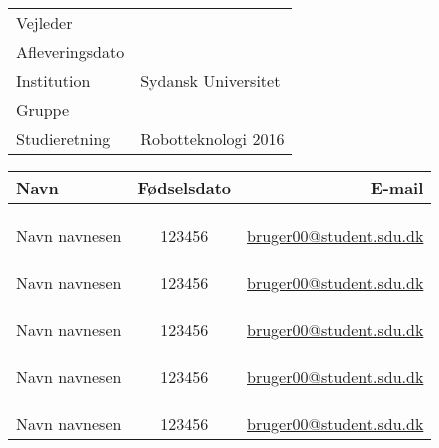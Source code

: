 \documentclass[../main.tex]{subfiles}
\begin{document}
\phantom{g}
\vspace{0.5cm}
\noindent
\begin{center}
\begin{Huge}
\textbf{\titel}
\end{Huge}
\\
\begin{huge}
\subtitel
\end{huge}
\\
\vspace{1cm}



\vspace{1.5cm}

\begin{tabular}{@{} l l @{}}
\hline
Vejleder         		&	\vejleder          	\\
Afleveringsdato 			& 	\dato				\\
Institution             	&   Sydansk Universitet	\\
Gruppe                  	&	\gruppe				\\
Studieretning           	& 	Robotteknologi 2016	\\
\hline
\end{tabular}
\thispagestyle{empty}

\vspace{1.5cm}


\newcommand{\fmedlem}[3]{%
\multicolumn{3}{c}{}\\
\multicolumn{3}{c}{}\\
\multicolumn{3}{c}{}\\
\hline
#1 & #2 & 	\href{mailto:#3@student.sdu.dk}{#3@student.sdu.dk}\\
}

\begin{tabular}{ l  c  r }

Navn						& Fødselsdato &	E-mail \\ 
\hline
\fmedlem{Navn navnesen}{123456}{bruger00}
\fmedlem{Navn navnesen}{123456}{bruger00}
\fmedlem{Navn navnesen}{123456}{bruger00}
\fmedlem{Navn navnesen}{123456}{bruger00}
\fmedlem{Navn navnesen}{123456}{bruger00}
\end{tabular}
\end{center}
\end{document}
